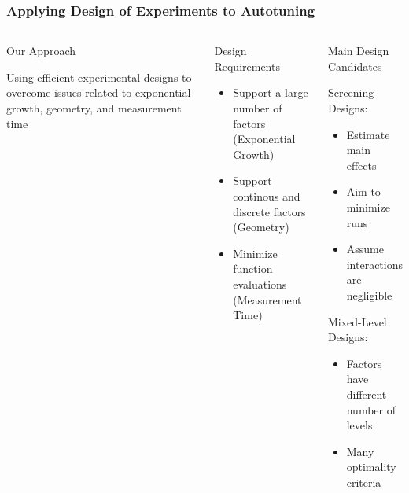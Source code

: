 \documentclass[10pt, compress, aspectratio=169, xcolor={table,usenames,dvipsnames}]{beamer}
\begin{document}
\begin{frame}
    \frametitle{Applying Design of Experiments to Autotuning}
    \begin{columns}[c]
            \begin{block}{Our Approach}

                \vspace{.2cm}

                Using \alert{efficient experimental designs} to overcome issues
                related to \alert{exponential growth}, \alert{geometry}, and
                \alert{measurement time}
            \end{block}

            \begin{block}{Design Requirements}
                \begin{itemize}
                    \item Support a large number of factors (\alert{Exponential Growth})
                    \item Support continous and discrete factors (\alert{Geometry})
                    \item Minimize function evaluations (\alert{Measurement Time})
                \end{itemize}
            \end{block}

            \begin{block}{Main Design Candidates}

                \vspace{.2cm}

                \alert{Screening} Designs:

                \begin{itemize}
                    \item Estimate \alert{main effects}
                    \item Aim to \alert{minimize runs}
                    \item Assume \alert{interactions are negligible}
                \end{itemize}

                \alert{Mixed-Level} Designs:

                \begin{itemize}
                    \item Factors have \alert{different number of levels}
                    \item Many \alert{optimality criteria}
                \end{itemize}

            \end{block}

    \end{columns}
\end{frame}
\end{document}
